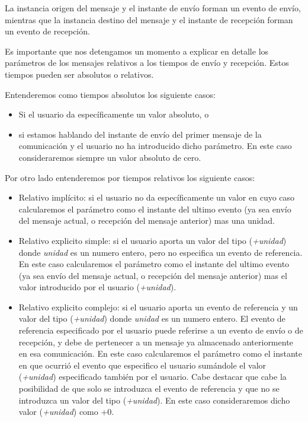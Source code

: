 \documentclass[12pt,a4paper]{report}
\begin{document}
La instancia origen del mensaje y el instante de envío forman un evento de envío, mientras que la instancia destino del mensaje y el instante de recepción forman un evento de recepción.

Es importante que nos detengamos un momento a explicar en detalle los parámetros de los mensajes relativos a los tiempos de envío y recepción. Estos tiempos pueden ser absolutos o relativos. 

Entenderemos como tiempos absolutos los siguiente casos:

\begin{itemize}
\item Si el usuario da específicamente un valor absoluto, o
\item si estamos hablando del instante de envío del primer mensaje de la comunicación y el usuario no ha introducido dicho parámetro. En este caso consideraremos siempre un valor absoluto de cero. 
\end{itemize}

Por otro lado entenderemos por tiempos relativos los siguiente casos:

\begin{itemize}
\item Relativo implícito: si el usuario no da específicamente un valor en cuyo caso calcularemos el parámetro como el instante del ultimo evento (ya sea envío del mensaje actual, o recepción del mensaje anterior) mas una unidad.
\item Relativo explicito simple: si el usuario aporta un valor del tipo (\textit{+unidad}) donde \textit{unidad} es un numero entero, pero no especifica un evento de referencia. En este caso calcularemos el parámetro como el instante del ultimo evento (ya sea envío del mensaje actual, o recepción del mensaje anterior) mas el valor introducido por el usuario (\textit{+unidad}).
\item Relativo explicito complejo: si el usuario aporta un evento de referencia y un valor del tipo (\textit{+unidad}) donde \textit{unidad} es un numero entero. El evento de referencia especificado por el usuario puede referirse a un evento de envío o de recepción, y debe de pertenecer a un mensaje ya almacenado anteriormente en esa comunicación. En este caso calcularemos el parámetro como el instante en que ocurrió el evento que especifico el usuario sumándole el valor (\textit{+unidad}) especificado también por el usuario. Cabe destacar que cabe la posibilidad de que solo se introduzca el evento de referencia y que no se introduzca un valor del tipo (\textit{+unidad}). En este caso consideraremos dicho valor (\textit{+unidad}) como +0.
\end{itemize}
\end{document}
